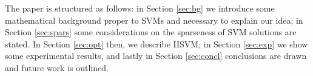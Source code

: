 The paper is structured as follows: in Section \ref{sec:bg} we
introduce some mathematical background proper to SVMs and necessary to
explain our idea; in Section \ref{sec:spars} some considerations on
the sparseness of SVM solutions are stated. In Section \ref{sec:opt}
then, we describe IISVM; in Section \ref{sec:exp} we show some
experimental results, and lastly in Section \ref{sec:concl}
conclusions are drawn and future work is outlined.
